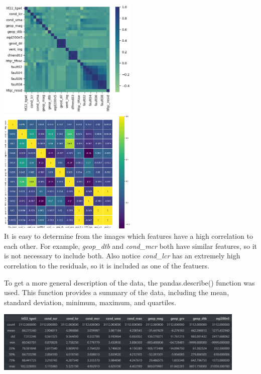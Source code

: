 \documentclass{article}[12pt]
\begin{document}
\includegraphics[width=0.5\textwidth]{seaborn-1.png}
\includegraphics[width=0.5\textwidth]{seaborn-2.png}\\

\indent
It is easy to determine from the images which features have a high correlation to each other. For example, \emph{geop\_dtb} and \emph{cond\_mcr} both have similar features, so it is not necessary to include both. Also notice \emph{cond\_lcr} has an extremely high correlation to the residuals, so it is included as one of the featuers.\\
\indent

To get a more general description of the data, the pandas.describe() function was used. This function provides a summary of the data, including the mean, standard deviation, minimum, maximum, and quartiles.\\

\begin{center}
    \includegraphics[width=0.9\textwidth]{describe.png}\\
\end{center}
\end{document}

